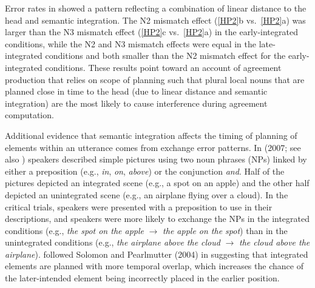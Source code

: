\documentclass[12pt,titlepage]{article}
\newcommand{\IGNORE}[1]{} %
\begin{document}
Error rates in  showed a pattern reflecting a combination of linear distance to the head and semantic integration.  The N2 mismatch effect (\ref{HP2}b vs.~\ref{HP2}a) was larger than the N3 mismatch effect (\ref{HP2}c vs.~\ref{HP2}a) in the early-integrated conditions, while the N2 and N3 mismatch effects were equal in the late-integrated conditions and both smaller than the N2 mismatch effect for the early-integrated conditions. \IGNORE{These results suggest that structural relations are not necessary to explain mismatch effects within complex subject NPs with phrasal modifiers. }These results point toward an account of agreement production that relies on scope of planning such that plural local nouns that are planned close in time to the head (due to linear distance and semantic integration) are the most likely to cause interference during agreement computation. 


Additional evidence that semantic integration affects the timing of planning of elements within an utterance comes from exchange error patterns. In \citeauthor{PearlmutterSolomonCUNY07} (2007; see also ) speakers described simple pictures using two noun phrases (NPs) linked by either a preposition (e.g., \textit{in}, \textit{on}, \textit{above}) or the conjunction \textit{and}.  Half of the pictures depicted an integrated scene (e.g., a spot on an apple) and the other half depicted an unintegrated scene (e.g., an airplane flying over a cloud). In the critical trials, speakers were presented with a preposition to use in their descriptions, and speakers were more likely to exchange the NPs in the integrated conditions (e.g., \textit{the spot on the apple} $\rightarrow$ \textit{the apple on the spot}) than in the unintegrated conditions (e.g., \textit{the airplane above the cloud} $\rightarrow$ \textit{the cloud above the airplane}). \citeauthor{PearlmutterSolomonCUNY07} followed Solomon and Pearlmutter (2004) in suggesting that integrated elements are planned with more temporal overlap, which increases the chance of the later-intended element being incorrectly placed in the earlier position.
 
\end{document}
